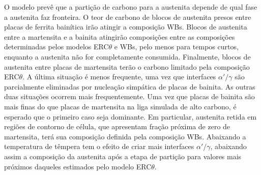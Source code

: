 O modelo prevê que a partição de carbono para a austenita depende de qual fase a austenita faz fronteira. O teor de carbono de blocos de austenita presos entre placas de ferrita bainítica irão atingir a composição WBs. Blocos de austenita entre a martensita e a bainita atingirão composições entre as composições determinadas pelos modelos ERC$\theta$ e WBs, pelo menos para tempos curtos, enquanto a austenita não for completamente consumida. Finalmente, blocos de austenita entre placas de martensita terão o carbono limitado pela composição ERC$\theta$. A última situação é menos frequente, uma vez que interfaces $\alpha'/\gamma$ são parcialmente eliminadas por nucleação simpática de placas de bainita. As outras duas situações ocorrem mais frequentemente. Uma vez que placas de bainita são mais finas do que placas de martensita na liga simulada de alto carbono, é esperado que o primeiro caso seja dominante. Em particular, austenita retida em regiões de contorno de célula, que apresentam fração próxima de zero de martensita, terá sua composição definida pela composição WBs.
Abaixando a temperatura de têmpera tem o efeito de criar mais interfaces $\alpha'/\gamma$, abaixando assim a composição da austenita após a etapa de partição para valores mais próximos daqueles estimados pelo modelo ERC$\theta$.





